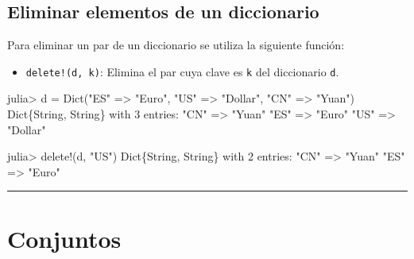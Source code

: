 \documentclass[
  letterpaper,
  DIV=11,
  numbers=noendperiod]{scrreprt}
\newenvironment{Shaded}{\begin{snugshade}}{\end{snugshade}}
\newcommand{\DataTypeTok}[1]{\textcolor[rgb]{0.68,0.00,0.00}{#1}}
\newcommand{\FloatTok}[1]{\textcolor[rgb]{0.68,0.00,0.00}{#1}}
\newcommand{\FunctionTok}[1]{\textcolor[rgb]{0.28,0.35,0.67}{#1}}
\newcommand{\NormalTok}[1]{\textcolor[rgb]{0.00,0.23,0.31}{#1}}
\newcommand{\OperatorTok}[1]{\textcolor[rgb]{0.37,0.37,0.37}{#1}}
\newcommand{\StringTok}[1]{\textcolor[rgb]{0.13,0.47,0.30}{#1}}
\providecommand{\tightlist}{%
  \setlength{\itemsep}{0pt}\setlength{\parskip}{0pt}}\usepackage{longtable,booktabs,array}
\begin{document}
\hypertarget{eliminar-elementos-de-un-diccionario}{%
\subsection{Eliminar elementos de un
diccionario}\label{eliminar-elementos-de-un-diccionario}}

Para eliminar un par de un diccionario se utiliza la siguiente función:

\begin{itemize}
\tightlist
\item
  \texttt{delete!(d,\ k)}: Elimina el par cuya clave es \texttt{k} del
  diccionario \texttt{d}.
\end{itemize}

\begin{Shaded}
\begin{Highlighting}[]
\NormalTok{julia}\OperatorTok{\textgreater{}}\NormalTok{ d }\OperatorTok{=} \FunctionTok{Dict}\NormalTok{(}\StringTok{"ES"} \OperatorTok{=\textgreater{}} \StringTok{"Euro"}\NormalTok{, }\StringTok{"US"} \OperatorTok{=\textgreater{}} \StringTok{"Dollar"}\NormalTok{, }\StringTok{"CN"} \OperatorTok{=\textgreater{}} \StringTok{"Yuan"}\NormalTok{)}
\DataTypeTok{Dict}\NormalTok{\{}\DataTypeTok{String}\NormalTok{, }\DataTypeTok{String}\NormalTok{\} with }\FloatTok{3}\NormalTok{ entries}\OperatorTok{:}
  \StringTok{"CN"} \OperatorTok{=\textgreater{}} \StringTok{"Yuan"}
  \StringTok{"ES"} \OperatorTok{=\textgreater{}} \StringTok{"Euro"}
  \StringTok{"US"} \OperatorTok{=\textgreater{}} \StringTok{"Dollar"}

\NormalTok{julia}\OperatorTok{\textgreater{}} \FunctionTok{delete!}\NormalTok{(d, }\StringTok{"US"}\NormalTok{)}
\DataTypeTok{Dict}\NormalTok{\{}\DataTypeTok{String}\NormalTok{, }\DataTypeTok{String}\NormalTok{\} with }\FloatTok{2}\NormalTok{ entries}\OperatorTok{:}
  \StringTok{"CN"} \OperatorTok{=\textgreater{}} \StringTok{"Yuan"}
  \StringTok{"ES"} \OperatorTok{=\textgreater{}} \StringTok{"Euro"}
\end{Highlighting}
\end{Shaded}

\begin{center}\rule{0.5\linewidth}{0.5pt}\end{center}

\hypertarget{conjuntos}{%
\section{Conjuntos}\label{conjuntos}}
\end{document}

